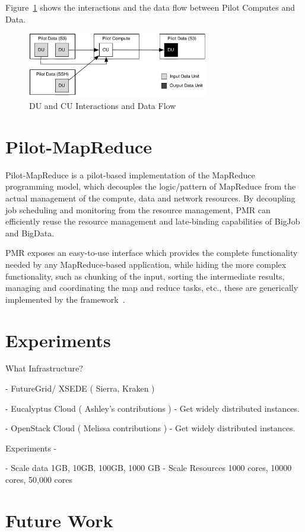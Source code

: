 \documentclass[times]{cpeauth}
\begin{document}
Figure~\ref{fig:figures_data-flow} shows the interactions and the data flow 
between Pilot Computes and Data.
\begin{figure}[htbp]
	\centering
		\includegraphics[width=0.7\textwidth]{figures/data-flow.pdf}
	\caption{DU and CU Interactions and Data Flow}
	\label{fig:figures_data-flow}
\end{figure}

\section{Pilot-MapReduce}
Pilot-MapReduce is a pilot-based implementation of the MapReduce
programming model, which decouples the logic/pattern of MapReduce from
the actual management of the compute, data and network resources. By
decoupling job scheduling and monitoring from the resource management,
PMR can efficiently reuse the resource management and late-binding
capabilities of BigJob and BigData.

PMR exposes an easy-to-use interface which provides the complete
functionality needed by any MapReduce-based application, while hiding
the more complex functionality, such as chunking of the input, sorting
the intermediate results, managing and coordinating the map and reduce
tasks, etc., these are generically implemented by the
framework~\cite{pmr2012}.

\section{Experiments}

What Infrastructure?

  - FutureGrid/ XSEDE ( Sierra, Kraken )

  - Eucalyptus Cloud ( Ashley's contributions )
    - Get widely distributed instances. 

  - OpenStack Cloud ( Melissa contributions )
    - Get widely distributed instances. 

Experiments -

  - Scale data 1GB, 10GB, 100GB, 1000 GB
  - Scale Resources 1000 cores, 10000 cores, 50,000 cores

\section{Future Work}



\end{document}
